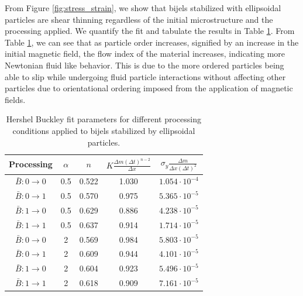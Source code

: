 From Figure \ref{fig:stress_strain}, we show that bijels stabilized with ellipsoidal particles are shear thinning regardless of the initial 
microstructure and the processing applied. We quantify the fit and tabulate the results in Table \ref{table:rheology_fit}. From Table 
\ref{table:rheology_fit}, we can see that as particle order increases, signified by an increase in the initial magnetic field, the flow index 
of the material increases, indicating more Newtonian fluid like behavior. This is due to the more ordered particles being able to slip
while undergoing fluid particle interactions without affecting other particles due to orientational ordering imposed from the application 
of magnetic fields.

\begin{table}[h!]
    \centering
    \begin{tabular}{||c c c c c||} 
     \hline
     Processing & $\alpha$ & $n$ & $K \frac{\Delta m (\Delta t)^{n-2}}{\Delta x} $ & $\sigma_{y} \frac{\Delta m}{\Delta x (\Delta t)^2}$ \\ [0.5ex] 
     \hline\hline
     $\bar{B}: 0 \rightarrow 0$ & 0.5 & 0.522 & 1.030 & $1.054 \cdot 10^{-4}$ \\ 
     \hline
     $\bar{B}: 0 \rightarrow 1$ & 0.5 & 0.570 & 0.975 & $5.365 \cdot 10^{-5}$ \\
     \hline
     $\bar{B}: 1 \rightarrow 0$ & 0.5 & 0.629 & 0.886 & $4.238 \cdot 10^{-5}$ \\
     \hline
     $\bar{B}: 1 \rightarrow 1$ & 0.5 & 0.637 & 0.914 & $1.714 \cdot 10^{-5}$ \\
     \hline
     $\bar{B}: 0 \rightarrow 0$ & 2 & 0.569 & 0.984 & $5.803 \cdot 10^{-5}$ \\
     \hline
     $\bar{B}: 0 \rightarrow 1$ & 2 & 0.609 & 0.944 & $4.101 \cdot 10^{-5}$ \\
     \hline
     $\bar{B}: 1 \rightarrow 0$ & 2 & 0.604 & 0.923 & $5.496 \cdot 10^{-5}$ \\
     \hline
     $\bar{B}: 1 \rightarrow 1$ & 2 & 0.618 & 0.909 & $7.161 \cdot 10^{-5}$ \\ [1ex] 
     \hline
    \end{tabular}
    \caption{Hershel Buckley fit parameters for different processing conditions applied to bijels stabilized by ellipsoidal particles.}
    \label{table:rheology_fit}
\end{table}

 

